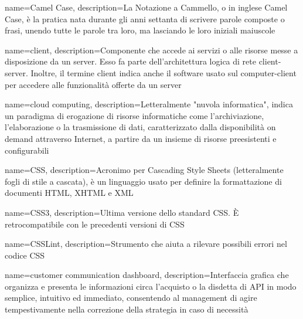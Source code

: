\hypertarget{C}{}

{
	name=Camel Case,
	description={La Notazione a Cammello, o in inglese Camel Case, è la pratica nata durante gli anni settanta di scrivere parole composte o frasi, unendo tutte le parole tra loro, ma lasciando le loro iniziali maiuscole}
}

{
	name=client,
	description={Componente che accede ai servizi o alle risorse messe a disposizione da un server. Esso fa parte dell'architettura logica di rete client-server. Inoltre, il termine client indica anche il software usato sul computer-client per accedere alle funzionalità offerte da un server}
}

{
	name=cloud computing,
	description={Letteralmente "nuvola informatica", indica un paradigma di erogazione di risorse informatiche come l'archiviazione, l'elaborazione o la trasmissione di dati, caratterizzato dalla disponibilità on demand attraverso Internet, a partire da un insieme di risorse preesistenti e configurabili}
}

{
	name=CSS,
	description={Acronimo per Cascading Style Sheets (letteralmente fogli di stile a cascata), è un linguaggio usato per definire la formattazione di documenti HTML, XHTML e XML}
}

{
	name=CSS3,
	description={Ultima versione dello standard CSS. \MakeUppercase{è} retrocompatibile con le precedenti versioni di CSS}
}

{
	name=CSSLint,
	description={Strumento che aiuta a rilevare possibili errori nel codice CSS}
}

{
	name=customer communication dashboard,
	description={Interfaccia grafica che organizza e presenta le informazioni circa l'acquisto o la disdetta di API in modo semplice, intuitivo ed immediato, consentendo al management di agire tempestivamente nella correzione della strategia in caso di necessità}
}



	
